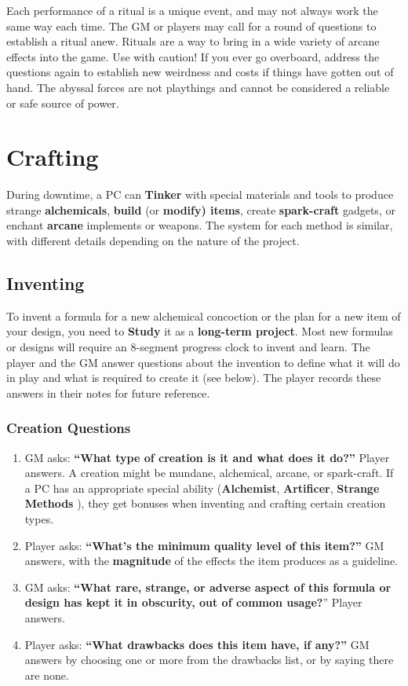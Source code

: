\documentclass[11pt,fleqn,a5paper]{book}
\newcommand{\gameterm}[1]{\textbf{#1}}
\begin{document}
Each performance of a ritual is a unique event, and may not always work the same way each time. The GM or players may call for a round of questions to establish a ritual anew. Rituals are a way to bring in a wide variety of arcane effects into the game. Use with caution! If you ever go overboard, address the questions again to establish new weirdness and costs if things have gotten out of hand. The abyssal forces are not playthings and cannot be considered a reliable or safe source of power.

\chapter{Crafting}

During downtime, a PC can \gameterm{Tinker}  with special materials and tools to produce strange\textbf{ alchemicals}, \textbf{build} (or \textbf{modify) items},\textbf{ }create \textbf{spark-craft} gadgets, or enchant \textbf{arcane} implements or weapons. The system for each method is similar, with different details depending on the nature of the project.

\section{Inventing}

To invent a formula for a new alchemical concoction or the plan for a new item of your design, you need to \gameterm{Study}  it as a \textbf{long-term project}. Most new formulas or designs will require an 8-segment progress clock to invent and learn. The player and the GM answer questions about the invention to define what it will do in play and what is required to create it (see below). The player records these answers in their notes for future reference.

\subsection{Creation Questions}

\begin{enumerate}
	\item GM asks: \textbf{“What type of creation is it and what does it do?”} Player answers. A creation might be mundane, alchemical, arcane, or spark-craft. If a PC has an appropriate special ability (\gameterm{Alchemist}, \gameterm{Artificer}, \gameterm{Strange Methods} ), they get bonuses when inventing and crafting certain creation types.
	\item Player asks: \textbf{“What’s the minimum quality level of this item?”} GM answers, with the \textbf{magnitude} of the effects the item produces as a guideline.
	\item GM asks: \textbf{“What rare, strange, or adverse aspect of this formula or design has kept it in obscurity, out of common usage?}” Player answers.
	\item Player asks: \textbf{“What drawbacks does this item have, if any?”} GM answers by choosing one or more from the drawbacks list, or by saying there are none.
\end{enumerate}
\end{document}

